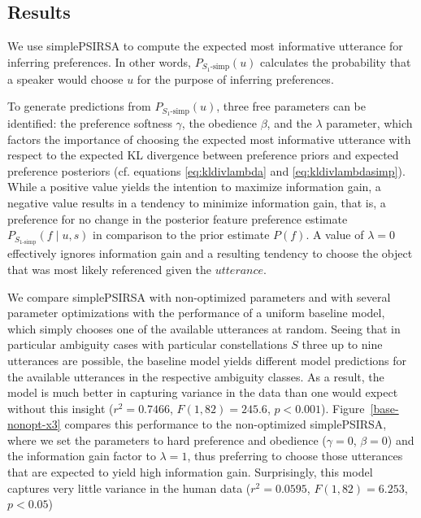 \documentclass[11pt,a4paper]{article}
\newcommand{\gcs}[1]{\textcolor{blue}{[gcs: #1]}}
\begin{document}
\subsection{Results}

We use simplePSIRSA to compute the expected most informative utterance for inferring preferences.
In other words, $P_{S_1\textrm{-simp}}(u)$ calculates the probability that a speaker would choose $u$ for the purpose of inferring preferences.

To generate predictions from $P_{S_1\textrm{-simp}}(u)$, three free parameters can be identified:
the preference softness $\gamma$, the obedience $\beta$, and the $\lambda$ parameter, which factors the importance of choosing the expected most informative utterance with respect to the expected KL divergence between preference priors and expected preference posteriors 
(cf. equations \ref{eq:kldivlambda} and \ref{eq:kldivlambdasimp}). 
While a positive value yields the intention to maximize information gain, 
a negative value results in a tendency to minimize information gain, that is, a preference for no change in the posterior feature preference estimate $P_{S_{1\textrm{-simp}}}(f\mid u,s)$ in comparison to the prior estimate $P(f)$. 
A value of $\lambda=0$ effectively ignores information gain and a resulting tendency to choose the object that was most likely referenced given the $utterance$.



We compare simplePSIRSA with non-optimized parameters and with several parameter optimizations with the performance of a uniform baseline model, which simply chooses one of the available utterances at random. 
Seeing that in particular ambiguity cases with particular constellations $S$ three up to nine utterances are possible, the baseline model yields different model predictions for the available utterances in the respective ambiguity classes. 
As a result, the model is much better in capturing variance in the data than one would expect without this insight ($r^2=0.7466$, $F(1,82) = 245.6$, $p<0.001$).
Figure~\ref{base-nonopt-x3} compares this performance to the non-optimized simplePSIRSA, where we set the parameters to hard preference and obedience ($\gamma=0$, $\beta=0$) and the information gain factor to $\lambda=1$, thus preferring to choose those utterances that are expected to yield high information gain. 
Surprisingly, this model captures very little variance in
the human data ($r^2=0.0595$, $F(1,82) = 6.253$, $p  < 0.05$)
\end{document}
